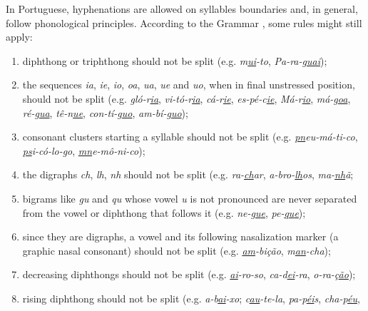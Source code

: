 \documentclass{article}
\begin{document}
In Portuguese, hyphenations are allowed on syllables boundaries and, in
general, follow phonological principles.  According to the Grammar
\cite{cunha2016,bergstrom2011,cegalla2008}, some rules might still apply:
\begin{enumerate}
    \item\label{rule-di-triphthong} diphthong or triphthong should not be split
	(e.g. \emph{m\underline{\emph{ui}}-to}, \emph{Pa-ra-g\underline{\emph{uai}}});
    \item\label{rule-unstressed} the sequences \emph{ia}, \emph{ie}, \emph{io}, \emph{oa}, \emph{ua},
	\emph{ue} and \emph{uo}, when in final unstressed position, should not be split 
	(e.g. \emph{gló-r\underline{\emph{ia}}}, \emph{vi-tó-r\underline{\emph{ia}}}, 
	\emph{cá-r\underline{\emph{ie}}}, \emph{es-pé-c\underline{\emph{ie}}}, 
	\emph{Má-r\underline{\emph{io}}}, \emph{má-g\underline{\emph{oa}}}, 
	\emph{ré-g\underline{\emph{ua}}}, \emph{tê-n\underline{\emph{ue}}}, 
	\emph{con-tí-g\underline{\emph{uo}}}, \emph{am-bí-g\underline{\emph{uo}}});
    \item\label{rule-c-clusters} consonant clusters starting a syllable should not be
	split (e.g. \emph{\underline{\emph{pn}}eu-má-ti-co}, \emph{\underline{\emph{ps}}i-có-lo-go}, 
	\emph{\underline{\emph{mn}}e-mô-ni-co});
    \item\label{rules-digraphs-ns} the digraphs	\emph{ch}, \emph{lh}, \emph{nh}
	should not be split (e.g. \emph{ra-\underline{\emph{ch}}ar},
	\emph{a-bro-\underline{\emph{lh}}os}, \emph{ma-\underline{\emph{nh}}ã};
    \item\label{rule-guqu} bigrams like \emph{gu} and \emph{qu} whose vowel \emph{u} is not 
	pronounced are never separated from the vowel or diphthong that follows it 
	(e.g. \emph{ne-\underline{\emph{gu}e}}, \emph{pe-\underline{\emph{qu}e}});
    \item\label{rule-nasalization} since they are digraphs, a vowel and its following 
	nasalization marker (a graphic nasal consonant) should not be split (e.g. \emph{\underline{\emph{am}}-bição},
	\emph{m\underline{\emph{an}}-cha});
    \item\label{rule-decreasing} decreasing diphthongs should not be split (e.g. 
	\emph{\underline{\emph{ai}}-ro-so}, \emph{ca-d\underline{\emph{ei}}-ra}, 
	\emph{o-ra-ç\underline{\emph{ão}}});
    \item\label{rule-rising} rising diphthong should not be split (e.g.
	\emph{a-b\underline{\emph{ai}}-xo}; \emph{c\underline{\emph{au}}-te-la}, 
	\emph{pa-p\underline{\emph{éi}}s}, \emph{cha-p\underline{\emph{éu}}}, 

\end{enumerate}
\end{document}
